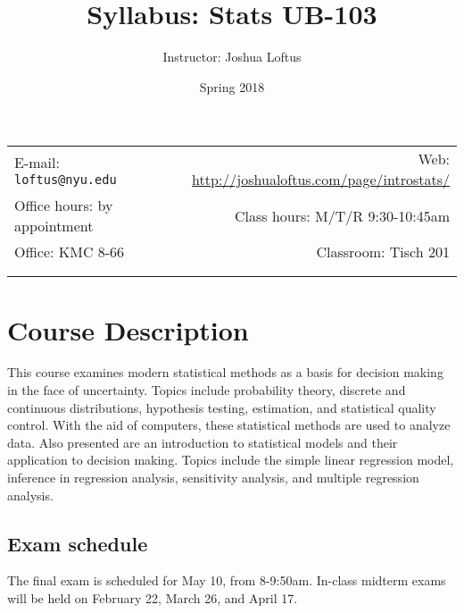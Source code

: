 \documentclass[11pt]{article}
\title{Syllabus: Stats UB-103}
\author{Instructor: Joshua Loftus}
\date{Spring 2018}
\newcommand{\blankline}{\quad\pagebreak[2]}
\begin{document}
\maketitle

\blankline

\begin{tabular*}{.93\textwidth}{@{\extracolsep{\fill}}lr}


E-mail: \texttt{loftus@nyu.edu} & Web: \url{http://joshualoftus.com/page/introstats/}  \\

 Office hours: by appointment  &  Class hours: M/T/R 9:30-10:45am \\

 Office: KMC 8-66 & Classroom: Tisch 201 \\
 & \\
&  \\
\hline
\end{tabular*}

\vspace{5 mm}


\section*{Course Description}

This course examines modern statistical methods as a basis for decision making in the face of uncertainty. Topics include probability theory, discrete and continuous distributions, hypothesis testing, estimation, and statistical quality control. With the aid of computers, these statistical methods are used to analyze data. Also presented are an introduction to statistical models and their application to decision making. Topics include the simple linear regression model, inference in regression analysis, sensitivity analysis, and multiple regression analysis.

\subsection*{Exam schedule}

The final exam is scheduled for May 10, from 8-9:50am. In-class midterm exams will be held on February 22, March 26, and April 17.
\end{document}
